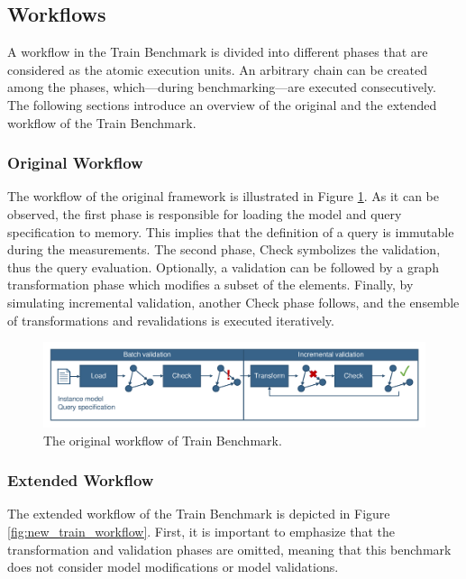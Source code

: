 \subsection{Workflows}

A workflow in the Train Benchmark is divided into different phases that are considered as the atomic execution units. An arbitrary chain can be created among the phases, which---during benchmarking---are executed consecutively. The following sections introduce an overview of the original and the extended workflow of the Train Benchmark.

\subsubsection{Original Workflow}
The workflow of the original framework is illustrated in Figure \ref{fig:old_train_workflow}. As it can be observed, the first phase is responsible for loading the model and query specification to memory. This implies that the definition of a query is immutable during the measurements. The second phase, \textsf{Check} symbolizes the validation, thus the query evaluation. Optionally, a validation can be followed by a graph transformation phase which modifies a subset of the elements. Finally, by simulating incremental validation, another \textsf{Check} phase follows, and the ensemble of transformations and revalidations is executed iteratively.


\begin{figure}[!ht]
	\centering
	\includegraphics[width=150mm, keepaspectratio]{figures/trainbenchmark-sequence.pdf}
	\caption{The original workflow of Train Benchmark.}
	\label{fig:old_train_workflow}
\end{figure}

\subsubsection{Extended Workflow}\label{sec:extended_workflow}

The extended workflow of the Train Benchmark is depicted in Figure \ref{fig:new_train_workflow}. First, it is important to emphasize that the transformation and validation phases are omitted, meaning that this benchmark does not consider model modifications or model validations.

